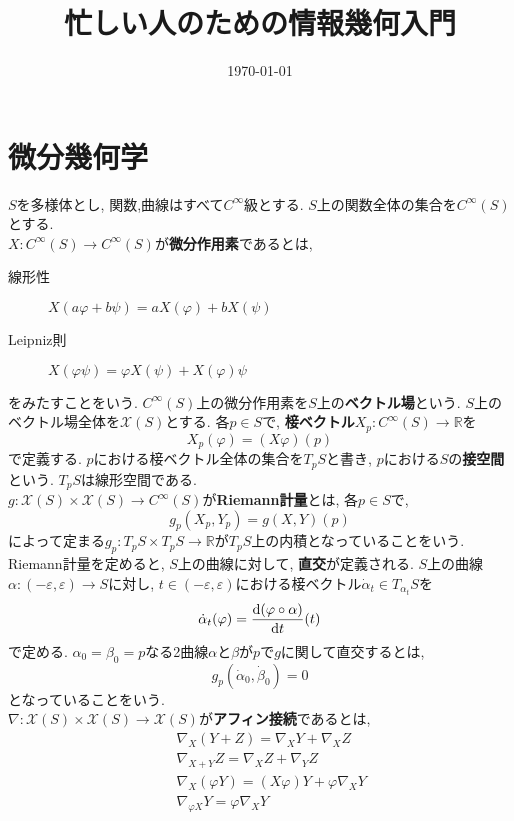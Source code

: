\documentclass{jarticle}
\title{忙しい人のための情報幾何入門}
\date{\today}
\theoremstyle{definition}
\begin{document}
	\maketitle
\section{微分幾何学}
	$S$を多様体とし, 関数,曲線はすべて$C^{\infty}$級とする. 
    $S$上の関数全体の集合を$C^\infty(S)$とする.\\
    $X:C^\infty(S)\to C^\infty(S)$が{\bf 微分作用素}であるとは, 
    \begin{center}
        \begin{description}
            \item[線形性] $X(a\varphi+b\psi)=a X(\varphi)+b X(\psi)$ 
            \item[Leipniz則] $X(\varphi\psi)=\varphi X(\psi)+X(\varphi)\psi$
        \end{description}
    \end{center}
    をみたすことをいう. 
    $C^\infty(S)$上の微分作用素を$S$上の{\bf ベクトル場}という. 
    $S$上のベクトル場全体を$\mathcal{X}(S)$とする. 
    各$p\in S$で, {\bf 椄ベクトル}$X_p:C^\infty(S)\to\mathbb{R}$を
    \[
    	X_p(\varphi)=(X\varphi)(p)
    \]
    で定義する. 
    $p$における椄ベクトル全体の集合を$T_p S$と書き, 
    $p$における$S$の{\bf 接空間}という. 
    $T_p S$は線形空間である.\\
    $g:\mathcal{X}(S)\times\mathcal{X}(S)\to C^\infty(S)$が{\bf Riemann計量}とは, 
    各$p\in S$で, 
    \[
    	g_p(X_p,Y_p)=g(X,Y)(p)
    \]
    によって定まる$g_p:T_p S\times T_p S\to\mathbb{R}$が$T_p S$上の内積となっていることをいう.\\
    Riemann計量を定めると, $S$上の曲線に対して, {\bf 直交}が定義される. 
    $S$上の曲線$\alpha:(-\varepsilon,\varepsilon)\to S$に対し, 
    $t\in(-\varepsilon, \varepsilon)$における椄ベクトル$\dot{\alpha}_t\in T_{\alpha_t}S$を
    \[
    	\dot{\alpha}_t(\varphi)=\frac{{\rm d}(\varphi\circ\alpha)}{{\rm d}t}(t)
    \]
    で定める. $\alpha_0=\beta_0=p$なる2曲線$\alpha$と$\beta$が$p$で$g$に関して直交するとは, 
    \[
    	g_p(\dot{\alpha}_0,\dot{\beta}_0)=0
    \]
   となっていることをいう.\\
   $\nabla:\mathcal{X}(S)\times\mathcal{X}(S)\to\mathcal{X}(S)$が{\bf アフィン接続}であるとは, 
   \begin{eqnarray*}
   		& &\nabla_X(Y+Z) = \nabla_X Y + \nabla_X Z \\
        & &\nabla_{X+Y}Z = \nabla_X Z + \nabla_Y Z \\
        & &\nabla_X(\varphi Y) = (X\varphi)Y+\varphi\nabla_X Y \\
        & &\nabla_{\varphi X}Y = \varphi\nabla_X Y
   \end{eqnarray*}
\end{document}
